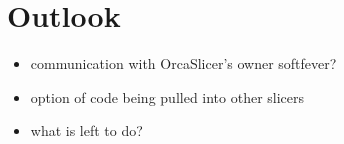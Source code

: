 \chapter{Outlook}\label{ch:outlook}

\begin{itemize}
    \item communication with OrcaSlicer's owner softfever? 
    \item option of code being pulled into other slicers 
    \item what is left to do? 
\end{itemize}